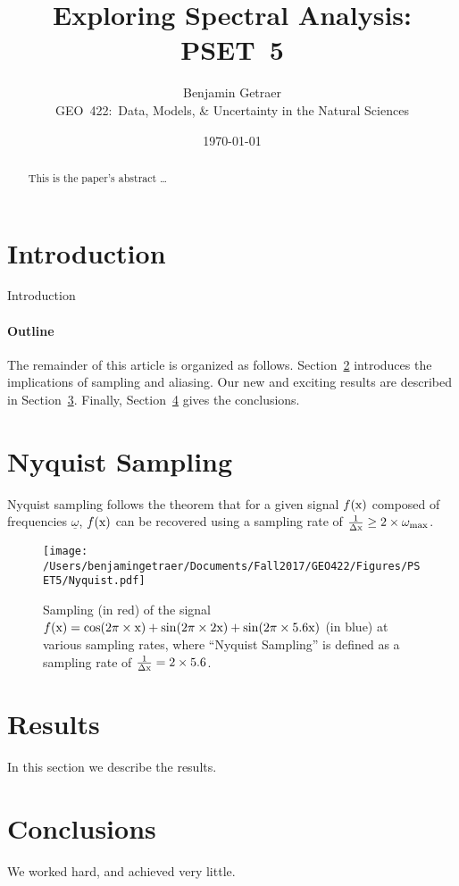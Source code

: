 \documentclass[11pt]{article}
\title{Exploring Spectral Analysis: PSET~5}
\author{
        Benjamin Getraer \\
        GEO~422:~Data, Models, \& Uncertainty in the Natural Sciences\\
}
\date{\today}
\begin{document}
\maketitle

\begin{abstract}
This is the paper's abstract \ldots
\end{abstract}

\section{Introduction}
Introduction

\paragraph{Outline}
The remainder of this article is organized as follows.
Section~\ref{sec:Nyquist} introduces the implications of sampling and aliasing.
Our new and exciting results are described in Section~\ref{results}.
Finally, Section~\ref{conclusions} gives the conclusions.

\section{Nyquist Sampling}\label{sec:Nyquist}
Nyquist sampling follows the theorem that for a given signal $f(\rm{x})$ composed of frequencies $\underline{\omega}$, $f(\rm{x})$ can be recovered using a sampling rate of $\frac{1}{\Delta\rm{x}}\ge2\times \omega_{\text{max}}$.
\begin{figure}[h!]
\centering

\texttt{[image: /Users/benjamingetraer/Documents/Fall2017/GEO422/Figures/PSET5/Nyquist.pdf]}

\caption{Sampling (in red) of the signal $f(\rm{x})=\cos(2\pi\times\rm{x}) +\sin(2\pi\times2\rm{x}) +\sin(2\pi\times5.6\rm{x})$ (in blue) at various sampling rates, where ``Nyquist Sampling'' is defined as a sampling rate of $\frac{1}{\Delta\rm{x}}=2\times5.6$.}
\end{figure}





\section{Results}\label{results}
In this section we describe the results.

\section{Conclusions}\label{conclusions}
We worked hard, and achieved very little.
\end{document}
